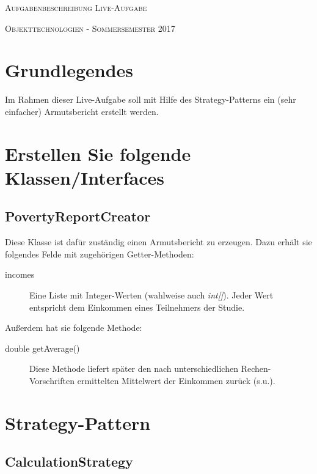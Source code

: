 \documentclass[oneside,a4paper]{scrartcl}
\author{Johannes Schneider}
\begin{document}
\centerline{\textsc{\LARGE Aufgabenbeschreibung Live-Aufgabe}}

\vspace{.5pc}
\centerline{\textsc{\large Objekttechnologien - Sommersemester 2017}}
\vspace{2pc}



\section{Grundlegendes}

Im Rahmen dieser Live-Aufgabe soll mit Hilfe des Strategy-Patterns ein (sehr einfacher) Armutsbericht erstellt werden.


\section{Erstellen Sie folgende Klassen/Interfaces}
\subsection{PovertyReportCreator}

Diese Klasse ist dafür zuständig einen Armutsbericht zu erzeugen.
Dazu erhält sie folgendes
Felde mit zugehörigen Getter-Methoden:

\begin{description}
  \item[incomes] Eine Liste mit Integer-Werten (wahlweise auch \emph{int[]}).
  Jeder Wert entspricht dem Einkommen eines Teilnehmers der Studie.
\end{description}

\noindent Außerdem hat sie folgende Methode:


\begin{description}
  \item[double getAverage()] Diese Methode liefert später den nach
  unterschiedlichen Rechen-Vorschriften ermittelten Mittelwert der
  Einkommen zurück (s.u.).
\end{description}


\section{Strategy-Pattern}

\subsection{CalculationStrategy}
\end{document}
